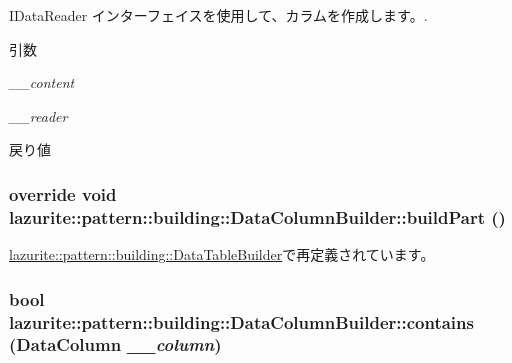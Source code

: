 IDataReader インターフェイスを使用して、カラムを作成します。. 
\begin{DoxyParams}{引数}
\item[{\em \_\-\_\-content}]\item[{\em \_\-\_\-reader}]\end{DoxyParams}
\begin{DoxyReturn}{戻り値}

\end{DoxyReturn}
\hypertarget{classlazurite_1_1pattern_1_1building_1_1_data_column_builder_a9f5d113f7c726c0ce117255ca6a6b776}{
\subsubsection[{buildPart}]{\setlength{\rightskip}{0pt plus 5cm}override void lazurite::pattern::building::DataColumnBuilder::buildPart ()}}
\label{classlazurite_1_1pattern_1_1building_1_1_data_column_builder_a9f5d113f7c726c0ce117255ca6a6b776}


\hyperlink{classlazurite_1_1pattern_1_1building_1_1_data_table_builder_a7854fcd46057380db161064c8dc6ce82}{lazurite::pattern::building::DataTableBuilder}で再定義されています。\hypertarget{classlazurite_1_1pattern_1_1building_1_1_data_column_builder_a5cd5878bc0681458b8800c1f066567bc}{
\subsubsection[{contains}]{\setlength{\rightskip}{0pt plus 5cm}bool lazurite::pattern::building::DataColumnBuilder::contains (DataColumn {\em \_\-\_\-column})}}
\label{classlazurite_1_1pattern_1_1building_1_1_data_column_builder_a5cd5878bc0681458b8800c1f066567bc}


